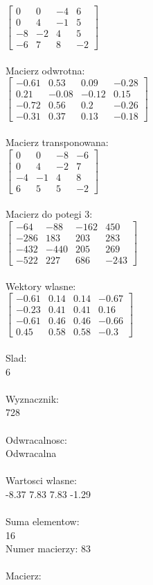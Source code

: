 \documentclass[a4paper,12pt]{article}
\begin{document}
$\begin{bmatrix} 0&0&-4&6\\0&4&-1&5\\-8&-2&4&5\\-6&7&8&-2 \end{bmatrix}$
\\
\\
Macierz odwrotna:\\

$\begin{bmatrix} -0.61&0.53&0.09&-0.28\\0.21&-0.08&-0.12&0.15\\-0.72&0.56&0.2&-0.26\\-0.31&0.37&0.13&-0.18 \end{bmatrix}$
\\
\\
Macierz transponowana:\\

$\begin{bmatrix} 0&0&-8&-6\\0&4&-2&7\\-4&-1&4&8\\6&5&5&-2 \end{bmatrix}$
\\
\\
Macierz do potegi 3:\\

$\begin{bmatrix} -64&-88&-162&450\\-286&183&203&283\\-432&-440&205&269\\-522&227&686&-243 \end{bmatrix}$
\\
\\
Wektory wlasne:\\

$\begin{bmatrix} -0.61&0.14&0.14&-0.67\\-0.23&0.41&0.41&0.16\\-0.61&0.46&0.46&-0.66\\0.45&0.58&0.58&-0.3 \end{bmatrix}$
\\
\\
Slad:\\
6
\\
\\
Wyznacznik:\\
728
\\
\\
Odwracalnosc:\\
Odwracalna
\\
\\
Wartosci wlasne:\\
-8.37 7.83 7.83 -1.29
\\
\\
Suma elementow:\\
16
\\
\newpage
Numer macierzy:
83
\\
\\
Macierz:\\
\end{document}
